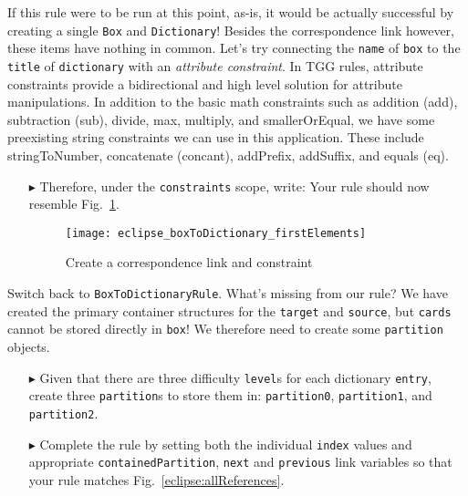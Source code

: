 If this rule were to be run at this point, as-is, it would be actually successful by creating a single \texttt{Box} and \texttt{Dictionary}! Besides the
correspondence link however, these items have nothing in common. Let's try connecting the \texttt{name} of \texttt{box} to the \texttt{title} of \texttt{dictionary} with an
\emph{attribute constraint}. In TGG rules, attribute constraints provide a bidirectional and high level solution for attribute manipulations. In addition to the
basic math constraints such as addition (add), subtraction (sub), divide, max, multiply, and smallerOrEqual, we have some preexisting string constraints
we can use in this application. These include stringToNumber, concatenate (concant), addPrefix, addSuffix, and equals (eq).

\begin{itemize}

\item[$\blacktriangleright$] Therefore, under the \texttt{constraints} scope, write:
Your rule should now resemble Fig.~\ref{eclipse:ruleBasic}.

\vspace{0.5cm}

\begin{figure}[htbp]
\begin{center}
  \texttt{[image: eclipse\_boxToDictionary\_firstElements]}
  \caption{Create a correspondence link and constraint}
  \label{eclipse:ruleBasic}
\end{center}
\end{figure}

\end{itemize}

Switch back to \texttt{BoxToDictionaryRule}. What's missing from our rule? We have created the primary container structures for the \texttt{target} and
\texttt{source}, but \texttt{cards} cannot be stored directly in \texttt{box}! We therefore need to create some \texttt{partition} objects. 

\begin{itemize}

\item[$\blacktriangleright$] Given that there are three difficulty \texttt{level}s for each dictionary \texttt{entry}, create three \texttt{partition}s to
store them in: \texttt{partition0}, \texttt{partition1}, and \texttt{partition2}. 

\vspace{0.5cm}

\item[$\blacktriangleright$] Complete the rule by setting both the individual \texttt{index} values and appropriate \texttt{containedPartition},
\texttt{next} and \texttt{previous} link variables so that your rule matches Fig.~\ref{eclipse:allReferences}.

\end{itemize}

